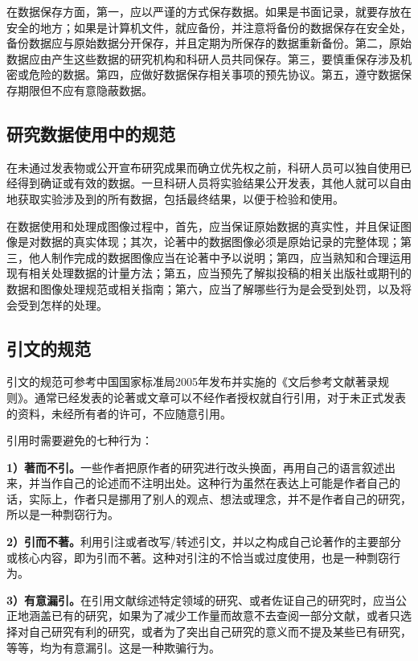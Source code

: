 在数据保存方面，第一，应以严谨的方式保存数据。如果是书面记录，就要存放在安全的地方；如果是计算机文件，就应备份，并注意将备份的数据保存在安全处，备份数据应与原始数据分开保存，并且定期为所保存的数据重新备份。第二，原始数据应由产生这些数据的研究机构和科研人员共同保存。第三，要慎重保存涉及机密或危险的数据。第四，应做好数据保存相关事项的预先协议。第五，遵守数据保存期限但不应有意隐蔽数据。

\subsection{研究数据使用中的规范}

在未通过发表物或公开宣布研究成果而确立优先权之前，科研人员可以独自使用已经得到确证或有效的数据。一旦科研人员将实验结果公开发表，其他人就可以自由地获取实验涉及到的所有数据，包括最终结果，以便于检验和使用。

在数据使用和处理成图像过程中，首先，应当保证原始数据的真实性，并且保证图像是对数据的真实体现；其次，论著中的数据图像必须是原始记录的完整体现；第三，他人制作完成的数据图像应当在论著中予以说明；第四，应当熟知和合理运用现有相关处理数据的计量方法；第五，应当预先了解拟投稿的相关出版社或期刊的数据和图像处理规范或相关指南；第六，应当了解哪些行为是会受到处罚，以及将会受到怎样的处理。


\subsection{引文的规范}

引文的规范可参考中国国家标准局2005年发布并实施的《文后参考文献著录规则》。通常已经发表的论著或文章可以不经作者授权就自行引用，对于未正式发表的资料，未经所有者的许可，不应随意引用。

引用时需要避免的七种行为：

\textbf{1）著而不引。}一些作者把原作者的研究进行改头换面，再用自己的语言叙述出来，并当作自己的论述而不注明出处。这种行为虽然在表达上可能是作者自己的话，实际上，作者只是挪用了别人的观点、想法或理念，并不是作者自己的研究，所以是一种剽窃行为。

\textbf{2）引而不著。}利用引注或者改写/转述引文，并以之构成自己论著作的主要部分或核心内容，即为引而不著。这种对引注的不恰当或过度使用，也是一种剽窃行为。

\textbf{3）有意漏引。}在引用文献综述特定领域的研究、或者佐证自己的研究时，应当公正地涵盖已有的研究，如果为了减少工作量而故意不去查阅一部分文献，或者只选择对自己研究有利的研究，或者为了突出自己研究的意义而不提及某些已有研究，等等，均为有意漏引。这是一种欺骗行为。

